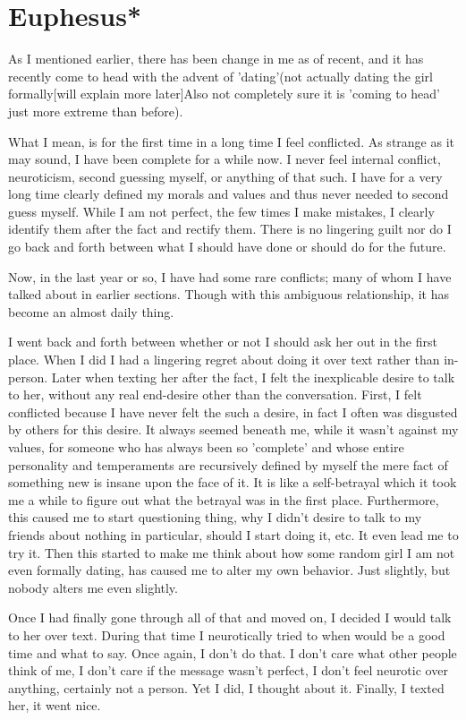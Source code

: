 \section{Euphesus*}
\par As I mentioned earlier, there has been change in me as of recent, and it has recently come to head with the advent of 'dating'(not actually dating the girl formally[will explain more later]{Also not completely sure it is 'coming to head' just more extreme than before}).
\par What I mean, is for the first time in a long time I feel conflicted. As strange as it may sound, I have  been complete for a while now. I never feel internal conflict, neuroticism, second guessing myself, or anything of that such. I have for a very long time clearly defined my morals and values and thus never needed to second guess myself. While I am not perfect, the few times I make mistakes, I clearly identify them after the fact and rectify them. There is no lingering guilt nor do I go back and forth between what I should have done or should do for the future. 
\par Now, in the last year or so, I have had some rare conflicts; many of whom I have talked about in earlier sections. Though with this ambiguous relationship, it has become an almost daily thing.
\par I went back and forth between whether or not I should ask her out in the first place. When I did I had a lingering regret about doing it over text rather than in-person. Later when texting her after the fact, I felt the inexplicable desire to talk to her, without any real end-desire other than the conversation. First, I felt conflicted because I have never felt the such a desire, in fact I often was disgusted by others for this desire. It always seemed beneath me, while it wasn't against my values, for someone who has always been so 'complete' and whose entire personality and temperaments are recursively defined by myself the mere fact of something new is insane upon the face of it. It is like a self-betrayal which it took me a while to figure out what the betrayal was in the first place. Furthermore, this caused me to start questioning thing, why I didn't desire to talk to my friends about nothing in particular, should I start doing it, etc. It even lead me to try it. Then this started to make me think about how some random girl I am not even formally dating, has caused me to alter my own behavior. Just slightly, but nobody alters me even slightly.
\par Once I had finally gone through all of that and moved on, I decided I would talk to her over text. During that time I neurotically tried to when would be a good time and what to say. Once again, I don't do that. I don't care what other people think of me, I don't care if the message wasn't perfect, I don't feel neurotic over anything, certainly not a person. Yet I did, I thought about it. Finally, I texted her, it went nice.
